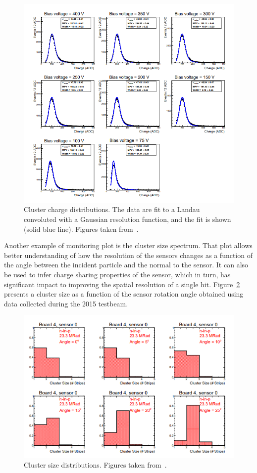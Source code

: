 \begin{figure}
\centering
\includegraphics{figures/landau.png}
\caption{Cluster charge distributions. The data are fit to a Landau 
convoluted with a Gaussian resolution function, and the fit is shown (solid blue line). Figures taken from~\cite{tb1}. 
}\label{fig:clusters_with_landau}
\end{figure}

Another example of monitoring plot is the cluster size spectrum. That plot allows better understanding of how the resolution of the sensors changes as a function of the angle between the incident particle and the normal to the sensor. It can also be used to infer charge sharing properties of the sensor, which in turn, has significant impact to improving the spatial resolution of a single hit. Figure~\ref{fig:clusters_size} presents a cluster size as a function of the sensor rotation angle obtained using data collected during the 2015 testbeam. 


\begin{figure}
\centering
\includegraphics{figures/Cluster_size.PNG}
\caption{Cluster size distributions. Figures taken from~\cite{tb1}. 
}\label{fig:clusters_size}
\end{figure}

 